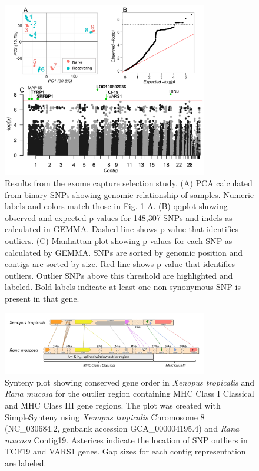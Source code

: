 \documentclass[9pt,twoside,lineno]{pnas-new}
\begin{document}
\newpage

\hfill\break

\begin{figure}

{\centering \includegraphics[width=0.8\textwidth]{figures/pca_qq_manhattan.png}

}

\caption{\label{fig-selectionresults}Results from the exome capture
selection study. (A) PCA calculated from binary SNPs showing genomic
relationship of samples. Numeric labels and colors match those in
Fig. 1 A. (B) qqplot showing observed and
expected p-values for 148,307 SNPs and indels as calculated in GEMMA.
Dashed line shows p-value that identifies outliers. (C) Manhattan plot
showing p-values for each SNP as calculated by GEMMA. SNPs are sorted by
genomic position and contigs are sorted by size. Red line shows p-value
that identifies outliers. Outlier SNPs above this threshold are
highlighted and labeled. Bold labels indicate at least one
non-synonymous SNP is present in that gene.\\
}

\end{figure}\clearpage

\begin{figure}

{\centering \includegraphics[width=0.8\textwidth]{figures/synteny_figure.png}

}

\caption{\label{fig-synteny-plot}Synteny plot showing conserved gene
order in \emph{Xenopus tropicalis} and \emph{Rana mucosa} for the
outlier region containing MHC Class I Classical and MHC Class III gene
regions. The plot was created with SimpleSynteny \citep{veltri2016}
using \emph{Xenopus tropicalis} Chromosome 8 (NC\_030684.2, genbank
accession GCA\_000004195.4) and \emph{Rana mucosa} Contig19. Asterices
indicate the location of SNP outliers in TCF19 and VARS1 genes. Gap
sizes for each contig representation are labeled.}

\end{figure}\clearpage
\end{document}

